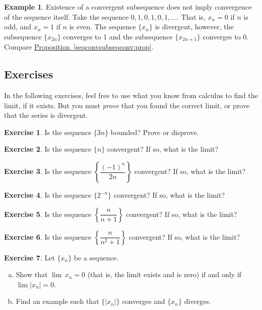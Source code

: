 \documentclass[12pt]{book}
\newcommand{\abs}[1]{\left\lvert {#1} \right\rvert}
\theoremstyle{plain}
\theoremstyle{remark}
\theoremstyle{definition}
\newenvironment{exnote}{\small}{}
\theoremstyle{exercise}
\newtheorem{exercise}{Exercise}[section]
\theoremstyle{example}
\newtheorem{example}[thm]{Example}
\newcommand{\propref}[1]{\hyperref[#1]{Proposition~\ref*{#1}}}
\begin{document}
\begin{example}
Existence of a convergent subsequence does not imply
convergence of the sequence itself.
Take the sequence $0,1,0,1,0,1,\ldots$.  That is,
$x_n = 0$ if $n$ is odd, and $x_n = 1$ if $n$ is even.  The sequence
$\{ x_n \}$ is divergent, however, the subsequence
$\{ x_{2n} \}$ converges to 1 and the subsequence
$\{ x_{2n+1} \}$ converges to 0.  Compare \propref{seqconvsubseqconv:prop}.
\end{example}

\subsection{Exercises}

\begin{exnote}
In the following exercises, feel free to use what you know from calculus to
find the limit, if it exists.  But you must \emph{prove}
that you
found the correct limit, or prove that the series is divergent.
\end{exnote}

\begin{exercise}
Is the sequence
$\{ 3n \}$
bounded?  Prove or disprove.
\end{exercise}

\begin{exercise}
Is the sequence
$\{ n \}$
convergent?  If so, what is the limit?
\end{exercise}

\begin{exercise}
Is the sequence
$\left\{ \dfrac{{(-1)}^n}{2n} \right\}$
convergent?  If so, what is the limit?
\end{exercise}

\begin{exercise}
Is the sequence
$\{ 2^{-n} \}$
convergent?  If so, what is the limit?
\end{exercise}

\begin{exercise}
Is the sequence
$\left\{ \dfrac{n}{n+1} \right\}$
convergent?  If so, what is the limit?
\end{exercise}

\begin{exercise}
Is the sequence
$\left\{ \dfrac{n}{n^2+1} \right\}$
convergent?  If so, what is the limit?
\end{exercise}

\begin{exercise} \label{exercise:absconv}
Let $\{ x_n \}$ be a sequence.
\begin{enumerate}[a)]
\item Show that $\lim\, x_n = 0$ (that is, the limit exists and is zero)
if and only if $\lim \abs{x_n} = 0$.
\item Find an example such that $\{ \abs{x_n} \}$ converges and $\{ x_n \}$
diverges.
\end{enumerate}
\end{exercise}
\end{document}
